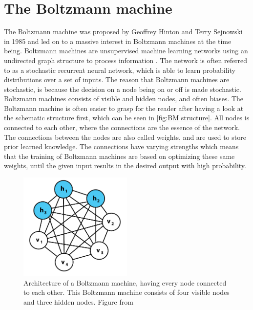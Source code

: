 \documentclass[../main.tex]{subfiles}
\begin{document}
\section{The Boltzmann machine}
\label{sec:BM}
The Boltzmann machine was proposed by Geoffrey Hinton and Terry Sejnowski in 1985 and led on to a massive interest in Boltzmann machines at the time being\cite{ACKLEY1985147}. Boltzmann machines are unsupervised machine learning networks using an undirected graph structure to process information \cite{VQB:litteraturelist}. The network is often referred to as a stochastic recurrent neural network, which is able to learn probability distributions over a set of inputs\cite{Hinton:2007}. The reason that Boltzmann machines are stochastic, is because the decision on a node being on or off is made stochastic. Boltzmann machines consists of visible and hidden nodes, and often biases. The Boltzmann machine is often easier to grasp for the reader after having a look at the schematic structure first, which can be seen in \autoref{fig:BM structure}. All nodes is connected to each other, where the connections are the essence of the network. The connections between the nodes are also called weights, and are used to store prior learned knowledge\cite{VQB:litteraturelist}. The connections have varying strengths which means that the training of Boltzmann machines are based on optimizing these same weights, until the given input results in the desired output with high probability.

\begin{figure}[h]
    \centering
    \includegraphics[width=0.5\textwidth]{figures/Boltzmannexamplev1.png}
    \caption{Architecture of a Boltzmann machine, having every node connected to each other. This Boltzmann machine consists of four visible nodes and three hidden nodes. Figure from \cite{BMfig}}
    \label{fig:BM structure}
\end{figure}
\end{document}
